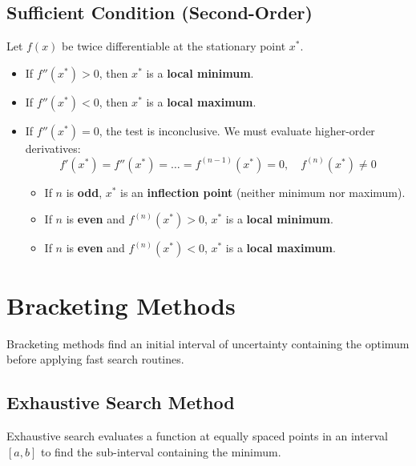 \documentclass[12pt,a4paper]{article}
\begin{document}
\subsection{Sufficient Condition (Second-Order)}
\begin{tcolorbox}[defbox, title={Theorem: Sufficient Condition}]
Let $f(x)$ be twice differentiable at the stationary point $x^*$.
\begin{itemize}[leftmargin=*, itemsep=2pt, topsep=0pt]
  \item If $f''(x^*) > 0$, then $x^*$ is a \textbf{local minimum}.
  \item If $f''(x^*) < 0$, then $x^*$ is a \textbf{local maximum}.
  \item If $f''(x^*) = 0$, the test is inconclusive. We must evaluate higher-order derivatives:
    \begin{equation}
      f'(x^*) = f''(x^*) = \dots = f^{(n-1)}(x^*) = 0, \quad f^{(n)}(x^*) \neq 0
    \end{equation}
    \begin{itemize}[label=\tiny$\bullet$, leftmargin=1.5em, itemsep=1.5pt]
      \item If $n$ is \textbf{odd}, $x^*$ is an \textbf{inflection point} (neither minimum nor maximum).
      \item If $n$ is \textbf{even} and $f^{(n)}(x^*) > 0$, $x^*$ is a \textbf{local minimum}.
      \item If $n$ is \textbf{even} and $f^{(n)}(x^*) < 0$, $x^*$ is a \textbf{local maximum}.
    \end{itemize}
\end{itemize}
\end{tcolorbox}

\section{Bracketing Methods}

Bracketing methods find an initial interval of uncertainty containing the optimum before applying fast search routines.

\subsection{Exhaustive Search Method}
Exhaustive search evaluates a function at equally spaced points in an interval $[a, b]$ to find the sub-interval containing the minimum.
\end{document}
